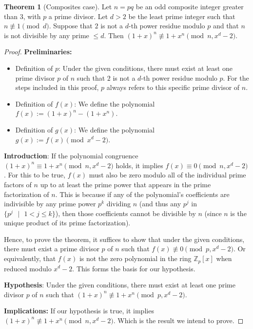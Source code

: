 \documentclass{article}
\theoremstyle{plain}
\theoremstyle{definition}
\newtheorem{theorem}{Theorem}
\begin{document}
\begin{theorem}[Composites case] \label{theorem:composites}
Let $n = pq$ be an odd composite integer greater than $3$, with $p$ a prime divisor. Let $d > 2$ be the least prime integer such that $n \not\equiv 1 \pmod{d}$. Suppose that $2$ is not a $d$-th power residue modulo $p$ and that $n$ is not divisible by any prime $\leq d$. Then $(1 + x)^n \not\equiv 1 + x^n \pmod{n, x^d-2}$.
\end{theorem}
\begin{proof}
\textbf{Preliminaries:}
\begin{itemize}
    \item Definition of $p$: Under the given conditions, there must exist at least one prime divisor $p$ of $n$ such that $2$ is not a $d$-th power residue modulo $p$. For the steps included in this proof, $p$ always refers to this specific prime divisor of $n$.
    \item Definition of $f(x)$: We define the polynomial $f(x) := (1 + x)^n - (1 + x^n)$.
    \item Definition of $g(x)$: We define the polynomial $g(x) := f(x) \pmod{x^d - 2}$.
\end{itemize}

\textbf{Introduction}:
If the polynomial congruence $(1 + x)^n \equiv 1 + x^n \pmod{n, x^d-2}$ holds, it implies $f(x) \equiv 0 \pmod{n, x^d-2}$. For this to be true, $f(x)$ must also be zero modulo all of the individual prime factors of $n$ up to at least the prime power that appears in the prime factorization of $n$. This is because if any of the polynomial's coefficients are indivisible by any prime power $p^k$ dividing $n$ (and thus any $p^j$ in $\{ p^j \text{ } | \text{ } 1 < j \leq k \}$), then those coefficients cannot be divisible by $n$ (since $n$ is the unique product of its prime factorization).

Hence, to prove the theorem, it suffices to show that under the given conditions, there must exist a prime divisor $p$ of $n$ such that $f(x) \not\equiv 0 \pmod{p, x^d-2}$. Or equivalently, that $f(x)$ is not the zero polynomial in the ring $\mathbb{Z}_p[x]$ when reduced modulo $x^d-2$. This forms the basis for our hypothesis.

\textbf{Hypothesis}: Under the given conditions, there must exist at least one prime divisor $p$ of $n$ such that $(1 + x)^n \not\equiv 1 + x^n \pmod{p, x^d-2}$.

\textbf{Implications:}
If our hypothesis is true, it implies $(1 + x)^n \not\equiv 1 + x^n \pmod{n, x^d-2}$. Which is the result we intend to prove.


\end{proof}
\end{document}
